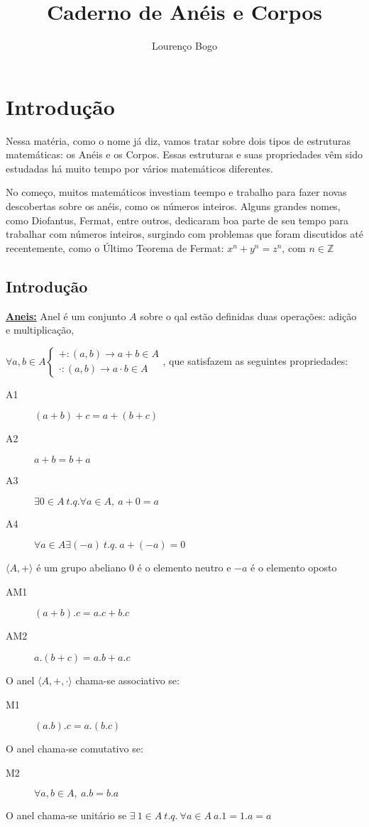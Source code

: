 \documentclass[12pt]{book}
\title{Caderno de Anéis e Corpos}
\author{Lourenço Bogo}
\date{}
\newcommand{\integer}{\mathbb{Z}}
\newcommand{\mytitle}[1]{\textbf{\underline{#1}}}
\newcommand{\ring}[1]{\langle #1 \rangle}
\begin{document}
\maketitle
\tableofcontents
\chapter{Introdução}
Nessa matéria, como o nome já diz, vamos tratar sobre dois tipos de estruturas matemáticas: os Anéis e os Corpos. Essas estruturas e suas propriedades vêm sido estudadas há muito tempo por vários matemáticos diferentes.

No começo, muitos matemáticos investiam teempo e trabalho para fazer novas descobertas sobre os anéis, como os números inteiros. Alguns grandes nomes, como Diofantus, Fermat, entre outros, dedicaram boa parte de seu tempo para trabalhar com números inteiros, surgindo com problemas que foram discutidos até recentemente, como o Último Teorema de Fermat: $x^n+y^n=z^n$, com $n\in \integer$


\section{Introdução}
\mytitle{Aneis:} Anel é um conjunto $A$ sobre o qal estão definidas duas operações: adição e multiplicação,

$\forall a,b \in A
\begin{cases}
  + : (a,b) \rightarrow a+b \in A \\
  \cdot : (a,b) \rightarrow a\cdot b \in A
\end{cases}
$, que satisfazem as seguintes propriedades:
\begin{description}
\item[A1] $(a+b)+c=a+(b+c)$
\item[A2] $a+b=b+a$
\item[A3] $\exists 0 \in A \: t.q. \forall a \in A,\: a+0=a$
\item[A4] $\forall a \in A \exists (-a)\: t.q. \: a+(-a)=0$
\end{description}
$\ring{A,+}$ é um grupo abeliano
$0$ é o elemento neutro e $-a$ é o elemento oposto
\begin{description}
\item[AM1] $(a+b).c=a.c+b.c$
\item[AM2] $a.(b+c)=a.b+a.c$
\end{description}
O anel $\ring{A,+,\cdot}$ chama-se associativo se:
\begin{description}
\item[M1] $(a.b).c=a.(b.c)$
\end{description}
O anel chama-se comutativo se:
\begin{description}
\item[M2] $\forall a,b \in A,\: a.b=b.a$
\end{description}
O anel chama-se unitário se $\exists \: 1 \in A\: t.q. \: \forall a \in A\: a.1=1.a=a$
\end{document}
